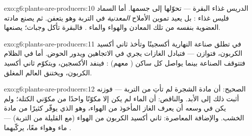 \begin{solution}{exo:g6:plants-are-producers:10}
الدريس غذاء البقرة ---  تحوّلها إلى جسمها. أما السماد
فليس غذاء : بل يعيد تموين الأملاح \emph{المعدنية} في التربة
وهو يتعفن. ثم يصنع  مادته العضوية بنفسه من تلك المعادن
والهواء والماء . فالبقرة تأكل وجبات؛  يصنعها.
\end{solution}

\begin{solution}{exo:g6:plants-are-producers:11}
في  تطلق صناعة  النهارية أكسجينًا وتأخذ ثاني أكسيد
الكربون، فتوازن   --- فتبادل الغازات يجري في
الاتجاهين ويدور الحوض. أما في الظلام فتتوقف الصناعة بينما يواصل كل
ساكن ( معهم) : فينفد الأكسجين، ويتكوّم ثاني أكسيد
الكربون، ويختنق العالم المغلق.
\end{solution}

\begin{solution}{exo:g6:plants-are-producers:12}
الصحيح: أن مادة الشجرة لم تأتِ من التربة --- فوزنه أثبت ذلك إلى
الأبد. والناقص: أن الماء لم يكن إلا مكوّنًا واحدًا من مكوّني
الكتلة؛ ولم يكن في وسعه أن يعرف الغاز المأخوذ من الهواء، وهو الذي
يوفّر كثيرًا من مادة الخشب. والإضافة المعاصرة: ثاني أكسيد الكربون
من الهواء (مع  القليلة من التربة) --- ماء وهواء
معًا، يركّبهما .
\end{solution}

